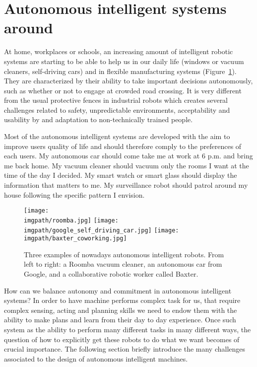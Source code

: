 \section{Autonomous intelligent systems around}

At home, workplaces or schools, an increasing amount of intelligent robotic systems are starting to be able to help us in our daily life (windows or vacuum cleaners, self-driving cars) \cite{gates2007robot} and in flexible manufacturing systems \cite{baxter} (Figure~\ref{fig:introduction:robots}). They are characterized by their ability to take important decisions autonomously, such as whether or not to engage at crowded road crossing. It is very different from the usual protective fences in industrial robots which creates several challenges related to safety, unpredictable environments, acceptability and usability by and adaptation to non-technically trained people. 

Most of the autonomous intelligent systems are developed with the aim to improve users quality of life and should therefore comply to the preferences of each users. My autonomous car should come take me at work at 6 p.m. and bring me back home. My vacuum cleaner should vacuum only the rooms I want at the time of the day I decided. My smart watch or smart glass should display the information that matters to me. My surveillance robot should patrol around my house following the specific pattern I envision.

\begin{figure}[!h]
    \centering
    \texttt{[image: \\imgpath/roomba.jpg]}
    \texttt{[image: \\imgpath/google\_self\_driving\_car.jpg]}
    \texttt{[image: \\imgpath/baxter\_coworking.jpg]}
    \caption{Three examples of nowadays autonomous intelligent robots. From left to right: a Roomba vacuum cleaner, an autonomous car from Google, and a collaborative robotic worker called Baxter.}
    \label{fig:introduction:robots}
\end{figure}

How can we balance autonomy and commitment in autonomous intelligent systems? In order to have machine performs complex task for us, that require complex sensing, acting and planning skills we need to endow them with the ability to make plans and learn from their day to day experience. Once such system as the ability to perform many different tasks in many different ways, the question of how to explicitly get these robots to do what we want becomes of crucial importance. The following section briefly introduce the many challenges associated to the design of autonomous intelligent machines.

